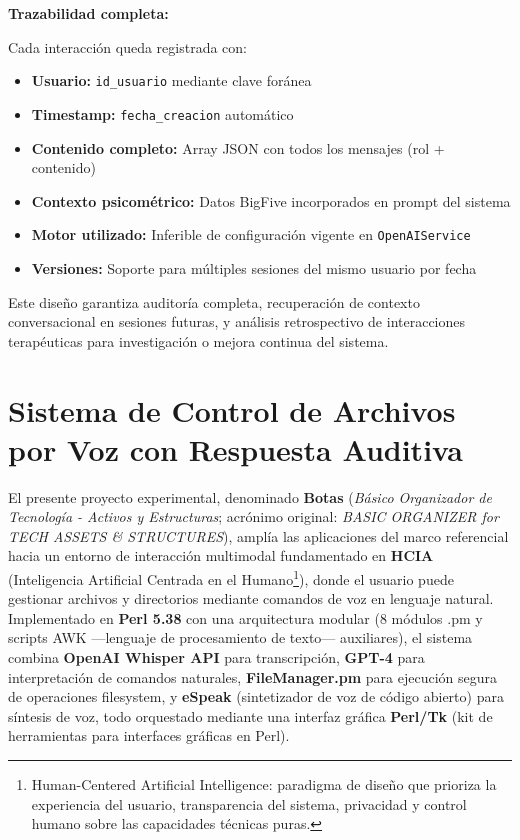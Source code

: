 \documentclass[12pt,a4paper]{report}
\numberwithin{figure}{section}
\begin{document}
\textbf{Trazabilidad completa:}

Cada interacción queda registrada con:
\begin{itemize}
  \item \textbf{Usuario:} \texttt{id\_usuario} mediante clave foránea
  \item \textbf{Timestamp:} \texttt{fecha\_creacion} automático
  \item \textbf{Contenido completo:} Array JSON con todos los mensajes (rol + contenido)
  \item \textbf{Contexto psicométrico:} Datos BigFive incorporados en prompt del sistema
  \item \textbf{Motor utilizado:} Inferible de configuración vigente en \texttt{OpenAIService}
  \item \textbf{Versiones:} Soporte para múltiples sesiones del mismo usuario por fecha
\end{itemize}

Este diseño garantiza auditoría completa, recuperación de contexto conversacional en sesiones futuras, y análisis retrospectivo de interacciones terapéuticas para investigación o mejora continua del sistema.

\section[Sistema de Control por Voz (Botas)]{Sistema de Control de Archivos por Voz con Respuesta Auditiva}
\label{sec:voz_archivos}

El presente proyecto experimental, denominado \textbf{Botas} (\textit{Básico Organizador de Tecnología - Activos y Estructuras}; acrónimo original: \textit{BASIC ORGANIZER for TECH ASSETS \& STRUCTURES}), amplía las aplicaciones del marco referencial hacia un entorno de interacción multimodal fundamentado en \textbf{HCIA} (Inteligencia Artificial Centrada en el Humano\footnote{Human-Centered Artificial Intelligence: paradigma de diseño que prioriza la experiencia del usuario, transparencia del sistema, privacidad y control humano sobre las capacidades técnicas puras.}), donde el usuario puede gestionar archivos y directorios mediante comandos de voz en lenguaje natural.  
Implementado en \textbf{Perl 5.38} con una arquitectura modular (8 módulos .pm y scripts AWK ---lenguaje de procesamiento de texto--- auxiliares), el sistema combina \textbf{OpenAI Whisper API} para transcripción, \textbf{GPT-4} para interpretación de comandos naturales, \textbf{FileManager.pm} para ejecución segura de operaciones filesystem, y \textbf{eSpeak} (sintetizador de voz de código abierto) para síntesis de voz, todo orquestado mediante una interfaz gráfica \textbf{Perl/Tk} (kit de herramientas para interfaces gráficas en Perl).
\end{document}
